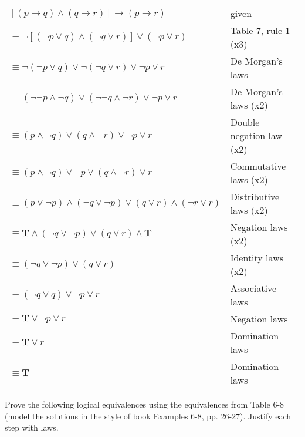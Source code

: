 \documentclass[12pt]{exam}
\newenvironment{my_parts}{
\begin{parts}
    \setlength{\itemsep}{1pt}
    \setlength{\parskip}{0pt}
    \setlength{\parsep}{0pt}
}{\end{parts}}
\begin{document}
\begin{questions}
\begin{solution}
    \begin{tabular}{|l|l|}
    \hline
    $[(p \rightarrow q) \wedge (q \rightarrow r)] \rightarrow (p
    \rightarrow r)$ & given \\
    $\equiv \neg[(\neg p \vee q) \wedge (\neg q \vee r)] \vee (\neg p \vee
    r)$ & Table 7, rule 1 (x3)\\
    $\equiv \neg(\neg p \vee q) \vee \neg(\neg q \vee r) \vee \neg p \vee
    r$ & De Morgan's laws \\
    $\equiv (\neg\neg p \wedge \neg q) \vee (\neg\neg q \wedge \neg r) \vee
    \neg p \vee r$ & De Morgan's laws (x2) \\
    $\equiv (p \wedge \neg q) \vee (q \wedge \neg r) \vee \neg p \vee r$ &
    Double negation law (x2)\\
    $\equiv (p \wedge \neg q) \vee \neg p \vee (q \wedge \neg r) \vee r$ &
    Commutative laws (x2)\\
    $\equiv (p \vee \neg p) \wedge (\neg q \vee \neg p) \vee (q \vee r) \wedge
    (\neg r \vee r)$ & Distributive laws (x2)\\
    $\equiv \mathbf{T} \wedge (\neg q \vee \neg p) \vee (q \vee r) \wedge
    \mathbf{T}$ & Negation laws (x2)\\
    $\equiv (\neg q \vee \neg p) \vee (q \vee r)$ & Identity laws (x2)\\
    $\equiv (\neg q \vee q) \vee \neg p \vee r$ & Associative laws \\
    $\equiv \mathbf{T} \vee \neg p \vee r$ & Negation laws \\
    $\equiv \mathbf{T} \vee r$ & Domination laws \\
    $\equiv \mathbf{T}$ & Domination laws \\
    \hline
   \end{tabular}
   \end{solution}

\question Prove the following logical equivalences using the
equivalences from Table 6-8 (model the solutions in the style of
book Examples 6-8, pp. 26-27).  Justify each step with laws.
    \begin{solution}
    \begin{my_parts}

\end{my_parts}
\end{solution}
\end{questions}
\end{document}
